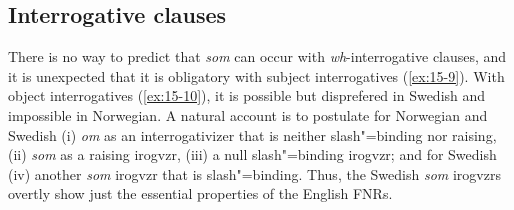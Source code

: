 \documentclass[output=paper]{LSP/langsci}
\begin{document}
\subsection{Interrogative clauses}

\randnum\label{rn:15-16}There is no way to predict that \textit{som} can occur
with \emph{wh}-interrogative clauses, and it is unexpected that it is
obligatory with subject interrogatives (\ref{ex:15-9}). With object interrogatives
(\ref{ex:15-10}), it is possible but disprefered in Swedish and impossible in
Norwegian.
\eal
\settowidth{}
\label{ex:15-9}
\zl
\eal%
\settowidth{}
\label{ex:15-10}
\ex[\%]{%
\gll
vi vet hvem som [\textsubscript{S}~Marit snakker med t] \\
we know who som \hphantom{[\textsubscript{S}~}Mary talks with \\\jambox{(10)}}
\ex[]{%
\gll
vi vet hvem [\textsubscript{S}~Marit snakker med t] \\
we know who \hphantom{[\textsubscript{S}~}Mary talks with \\\jambox{(9)}}
\zl
\randnum\label{rn:15-17}A natural account is to postulate for Norwegian and Swedish (i) \textit{om} as an interrogativizer that is neither slash"=binding nor raising, (ii) \textit{som}
as a raising irogvzr, (iii) a null slash"=binding irogvzr; and for
Swedish (iv) another \textit{som} irogvzr that is slash"=binding. Thus, the Swedish \textit{som}
irogvzrs overtly show just the essential properties of the English FNRs.
\end{document}
